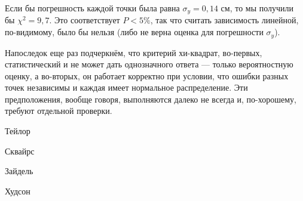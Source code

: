 \documentclass[10pt]{article}
\begin{document}
{\footnotesize{}Если бы погрешность каждой точки была равна $\sigma_{y}=0{,}14$
см, то мы получили бы $\chi^{2}=9{,}7$. Это соответствует $P<5\%$,
так что считать зависимость линейной, по-видимому, было бы нельзя
(либо не верна оценка для погрешности $\sigma_{y}$).}{\footnotesize\par}

{\small{}Напоследок еще раз подчеркнём, что критерий хи-квадрат, во-первых,
статистический и не может дать однозначного ответа --- только
вероятностную оценку, а во-вторых, он работает корректно при условии,
что ошибки разных точек независимы и каждая имеет нормальное распределение.
Эти предположения, вообще говоря, выполняются далеко не всегда и,
по-хорошему, требуют отдельной проверки.}{\small\par}
\begin{thebibliography}{1}
Тейлор

Сквайрс

Зайдель

Худсон
\end{thebibliography}
\end{document}
